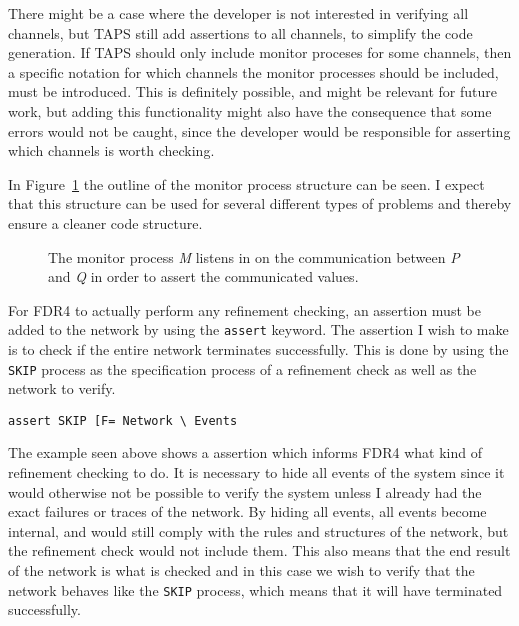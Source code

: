 There might be a case where the developer is not interested in verifying all channels, but TAPS still add assertions to all channels, to simplify the code generation. If TAPS should only include monitor proceses for some channels, then a specific notation for which channels the monitor processes should be included, must be introduced. This is definitely possible, and might be relevant for future work, but adding this functionality might also have the consequence that some errors would not be caught, since the developer would be responsible for asserting which channels is worth checking.

In Figure~\ref{fig:assertion_process} the outline of the monitor process structure can be seen. I expect that this structure can be used for several different types of problems and thereby ensure a cleaner code structure.
\begin{figure}[!ht]
  \centering
  \caption{The monitor process \textit{M} listens in on the communication between \textit{P} and \textit{Q} in order to assert the communicated values.}
  \label{fig:assertion_process}
\end{figure}

For FDR4 to actually perform any refinement checking, an assertion must be added to the network by using the \texttt{assert} keyword. The assertion I wish to make is to check if the entire network terminates successfully. This is done by using the \texttt{SKIP} process as the specification process of a refinement check as well as the network to verify.
\begin{verbatim}
assert SKIP [F= Network \ Events
\end{verbatim}
The example seen above shows a \cspm{} assertion which informs FDR4 what kind of refinement checking to do.
It is necessary to hide all events of the system since it would otherwise not be possible to verify the system unless I already had the exact failures or traces of the network. By hiding all events, all events become internal, and would still comply with the rules and structures of the network, but the refinement check would not include them. This also means that the end result of the network is what is checked and in this case we wish to verify that the network behaves like the \texttt{SKIP} process, which means that it will have terminated successfully.

